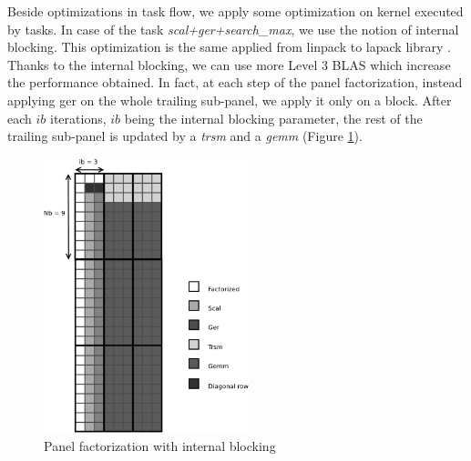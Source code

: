 Beside optimizations in task flow, we apply some optimization on kernel executed by tasks. In case of the task \textit{scal+ger+search\_max}, we use the notion of internal blocking. This optimization is the same applied from linpack to lapack library \cite{Anderson:1990:LPL}. Thanks to the internal blocking, we can use more Level 3 BLAS which increase the performance obtained. In fact, at each step of the panel factorization, instead applying ger on the whole trailing sub-panel, we apply it only on a block. After each $ib$ iterations, $ib$ being the internal blocking parameter, the rest of the trailing sub-panel is updated by a \textit{trsm} and  a \textit{gemm} (Figure \ref{fig:panel_ib}).

\begin{figure}[!ht]
\centering
\includegraphics[height=8cm]{figures/panel_ib_bw.pdf}
\caption{Panel factorization with internal blocking\label{fig:panel_ib}}
\end{figure}
